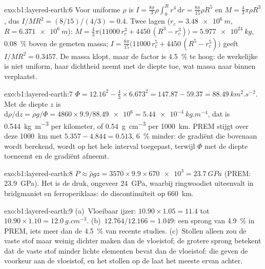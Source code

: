 \begin{solution}{exo:b1:layered-earth:6}
Voor uniforme $\rho$ is $I = \tfrac{8\pi}{3}\rho\int_0^R r^4\,\mathrm dr =
\tfrac{8\pi}{15}\rho R^5$ en $M = \tfrac43\pi\rho R^3$, dus
$I/MR^2 = (8/15)/(4/3) = 0.4$. Twee lagen ($r_c = \qty{3.48e6}{m}$,
$R = \qty{6.371e6}{m}$): $M = \tfrac43\pi\bigl(11000\,r_c^3 + 4450\,(R^3 -
r_c^3)\bigr) = \qty{5.977e24}{kg}$, \qty{0.08}{\percent} boven de gemeten
massa; $I = \tfrac{8\pi}{15}\bigl(11000\,r_c^5 + 4450\,(R^5 - r_c^5)\bigr)$ geeft
$I/MR^2 = 0.3457$. De massa klopt, maar de factor is \qty{4.5}{\percent}
te hoog: de werkelijke  is niet uniform, haar dichtheid neemt met de diepte toe, wat massa naar binnen verplaatst.
\end{solution}

\begin{solution}{exo:b1:layered-earth:7}
$\Phi = 12.16^2 - \tfrac43\times6.673^2 = 147.87 - 59.37 =
\qty{88.49}{km^2.s^{-2}}$. Met de diepte $z$ is
$\mathrm d\rho/\mathrm dz = \rho g/\Phi = 4860\times9.9/\num{88.49e6} =
\qty{5.44e-4}{kg.m^{-4}}$, dat is \qty{0.544}{kg.m^{-3}} per kilometer, of
\qty{0.54}{g.cm^{-3}} per \qty{1000}{km}. PREM stijgt over deze \qty{1000}{km} met $5.357 - 4.844 =
0.513$, \qty{6}{\percent} minder: de gradiënt die bovenaan wordt berekend, wordt op het hele interval toegepast, terwijl $\Phi$ met de diepte toeneemt en de gradiënt afneemt.
\end{solution}

\begin{solution}{exo:b1:layered-earth:8}
$P \approx \bar\rho g z = 3570\times9.9\times\num{670e3} = \qty{23.7}{GPa}$
(PREM: \qty{23.9}{GPa}). Het is de druk, ongeveer \qty{24}{GPa}, waarbij ringwoodiet uiteenvalt in
bridgmaniet en ferroperiklaas: de discontinuïteit op \qty{660}{km}.
\end{solution}

\begin{solution}{exo:b1:layered-earth:9}
(a)~Vloeibaar ijzer: $10.90\times1.05 = 11.4$ tot $10.90\times1.10 =
\qty{12.0}{g.cm^{-3}}$. (b)~$12.764/12.166 = 1.049$: een sprong van
\qty{4.9}{\percent} in PREM, iets meer dan de \qty{4.5}{\percent} van recente
studies. (c)~Stollen alleen zou de vaste stof maar weinig dichter maken dan de vloeistof; de grotere sprong betekent dat de
vaste stof minder lichte elementen bevat dan de vloeistof: die geven de voorkeur aan de vloeistof, en het stollen op de  laat het meeste ervan achter.
\end{solution}

